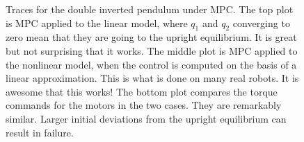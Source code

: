 \begin{figure}[htb!]
\caption[]{Traces for the double inverted pendulum under MPC. The top plot is MPC applied to the linear model, where $q_1$ and $q_2$ converging to zero mean that they are going to the upright equilibrium. It is great but not surprising that it works. The middle plot is MPC applied to the nonlinear model, when the control is computed on the basis of a linear approximation. This is what is done on many real robots. It is awesome that this works! The bottom plot compares the torque commands for the motors in the two cases. They are remarkably similar. Larger initial deviations from the upright equilibrium can result in failure.}
    \label{fig:SnapShotFallingPendulum02}
\end{figure}









